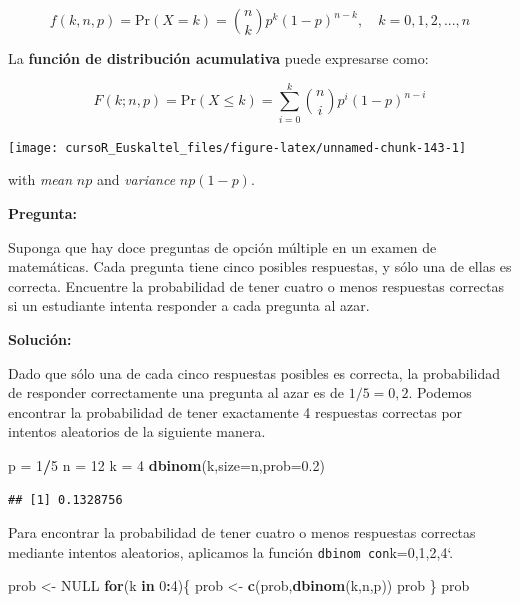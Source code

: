 \documentclass[]{book}
\newenvironment{Shaded}{\begin{snugshade}}{\end{snugshade}}
\newcommand{\KeywordTok}[1]{\textcolor[rgb]{0.13,0.29,0.53}{\textbf{#1}}}
\newcommand{\DataTypeTok}[1]{\textcolor[rgb]{0.13,0.29,0.53}{#1}}
\newcommand{\DecValTok}[1]{\textcolor[rgb]{0.00,0.00,0.81}{#1}}
\newcommand{\FloatTok}[1]{\textcolor[rgb]{0.00,0.00,0.81}{#1}}
\newcommand{\StringTok}[1]{\textcolor[rgb]{0.31,0.60,0.02}{#1}}
\newcommand{\OtherTok}[1]{\textcolor[rgb]{0.56,0.35,0.01}{#1}}
\newcommand{\ControlFlowTok}[1]{\textcolor[rgb]{0.13,0.29,0.53}{\textbf{#1}}}
\newcommand{\OperatorTok}[1]{\textcolor[rgb]{0.81,0.36,0.00}{\textbf{#1}}}
\newcommand{\NormalTok}[1]{#1}
\begin{document}
\[
{
f(k,n,p) = \mbox{Pr}(X=k)=\binom{n}{k} p^k (1-p)^{n-k}, \quad k=0,1,2,...,n
}
\]

La \textbf{función de distribución acumulativa} puede expresarse como:

\[
{
F(k;n,p) = \mbox{Pr}(X\leq k) = \sum_{i=0}^{k}\binom{n}{i} p^i (1-p)^{n-i}
}
\]

\begin{center}\texttt{[image: cursoR\_Euskaltel\_files/figure-latex/unnamed-chunk-143-1]} \end{center}

with \emph{mean} \(np\) and \emph{variance} \(np(1-p)\).

\textbf{Pregunta:}

Suponga que hay doce preguntas de opción múltiple en un examen de
matemáticas. Cada pregunta tiene cinco posibles respuestas, y sólo una
de ellas es correcta. Encuentre la probabilidad de tener cuatro o menos
respuestas correctas si un estudiante intenta responder a cada pregunta
al azar.

\textbf{Solución:}

Dado que sólo una de cada cinco respuestas posibles es correcta, la
probabilidad de responder correctamente una pregunta al azar es de
\(1/5=0,2\). Podemos encontrar la probabilidad de tener exactamente 4
respuestas correctas por intentos aleatorios de la siguiente manera.

\begin{Shaded}
\begin{Highlighting}[]
\NormalTok{p =}\StringTok{ }\DecValTok{1}\OperatorTok{/}\DecValTok{5}
\NormalTok{n =}\StringTok{ }\DecValTok{12}
\NormalTok{k =}\StringTok{ }\DecValTok{4}
\KeywordTok{dbinom}\NormalTok{(k,}\DataTypeTok{size=}\NormalTok{n,}\DataTypeTok{prob=}\FloatTok{0.2}\NormalTok{)}
\end{Highlighting}
\end{Shaded}

\begin{verbatim}
## [1] 0.1328756
\end{verbatim}

Para encontrar la probabilidad de tener cuatro o menos respuestas
correctas mediante intentos aleatorios, aplicamos la función
\texttt{dbinom\textquotesingle{}\ con}k=0,1,2,4`.

\begin{Shaded}
\begin{Highlighting}[]
\NormalTok{prob <-}\StringTok{ }\OtherTok{NULL}
\ControlFlowTok{for}\NormalTok{(k }\ControlFlowTok{in} \DecValTok{0}\OperatorTok{:}\DecValTok{4}\NormalTok{)\{}
\NormalTok{prob <-}\StringTok{ }\KeywordTok{c}\NormalTok{(prob,}\KeywordTok{dbinom}\NormalTok{(k,n,p))}
\NormalTok{prob}
\NormalTok{\}}
\NormalTok{prob}
\end{Highlighting}
\end{Shaded}
\end{document}
